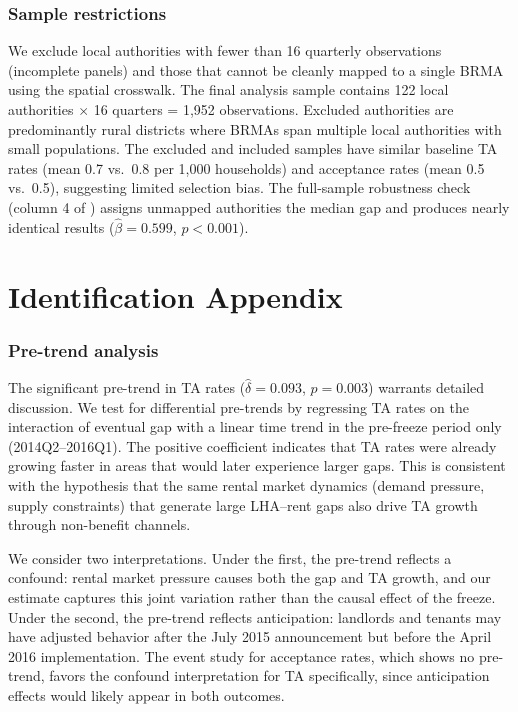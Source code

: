 \documentclass[12pt]{article}
\begin{document}
\subsubsection*{Sample restrictions} We exclude local authorities with fewer than 16 quarterly observations (incomplete panels) and those that cannot be cleanly mapped to a single BRMA using the spatial crosswalk. The final analysis sample contains 122 local authorities $\times$ 16 quarters = 1,952 observations. Excluded authorities are predominantly rural districts where BRMAs span multiple local authorities with small populations. The excluded and included samples have similar baseline TA rates (mean 0.7 vs.\ 0.8 per 1,000 households) and acceptance rates (mean 0.5 vs.\ 0.5), suggesting limited selection bias. The full-sample robustness check (column 4 of ) assigns unmapped authorities the median gap and produces nearly identical results ($\hat{\beta} = 0.599$, $p < 0.001$).


\section{Identification Appendix}
\label{sec:id_appendix}

\subsubsection*{Pre-trend analysis} The significant pre-trend in TA rates ($\hat{\delta} = 0.093$, $p = 0.003$) warrants detailed discussion. We test for differential pre-trends by regressing TA rates on the interaction of eventual gap with a linear time trend in the pre-freeze period only (2014Q2--2016Q1). The positive coefficient indicates that TA rates were already growing faster in areas that would later experience larger gaps. This is consistent with the hypothesis that the same rental market dynamics (demand pressure, supply constraints) that generate large LHA--rent gaps also drive TA growth through non-benefit channels.

We consider two interpretations. Under the first, the pre-trend reflects a confound: rental market pressure causes both the gap and TA growth, and our estimate captures this joint variation rather than the causal effect of the freeze. Under the second, the pre-trend reflects anticipation: landlords and tenants may have adjusted behavior after the July 2015 announcement but before the April 2016 implementation. The event study for acceptance rates, which shows no pre-trend, favors the confound interpretation for TA specifically, since anticipation effects would likely appear in both outcomes.
\end{document}
